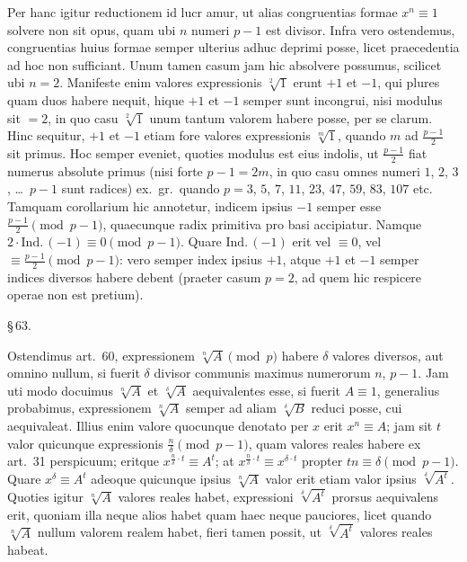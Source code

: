 \documentclass[12pt,a4paper]{article}
\theoremstyle{plain}
\theoremstyle{definition}
\theoremstyle{remark}
\begin{document}
Per hanc igitur reductionem id lucr amur, ut alias congruentias formae $x^n \equiv 1$ solvere non sit opus, quam ubi $n$ numeri $p-1$ est divisor. Infra vero ostendemus, congruentias huius formae semper ulterius adhuc deprimi posse, licet praecedentia ad hoc non sufficiant. Unum tamen casum jam hic absolvere possumus, scilicet ubi $n = 2$. Manifeste enim valores expressionis $\sqrt[2]{1}$ erunt $+1$ et $-1$, qui plures quam duos habere nequit, hique $+1$ et $-1$ semper sunt incongrui, nisi modulus sit $= 2$, in quo casu $\sqrt[2]{1}$ unum tantum valorem habere posse, per se clarum. Hinc sequitur, $+1$ et $-1$ etiam fore valores expressionis $\sqrt[m]{1}$, quando $m$ ad $\frac{p-1}{2}$ sit primus. Hoc semper eveniet, quoties modulus est eius indolis, ut $\frac{p-1}{2}$ fiat numerus absolute primus (nisi forte $p-1 = 2m$, in quo casu omnes numeri $1$, $2$, $3$, \dots\ $p-1$ sunt radices) ex.\ gr.\ quando $p = 3$, $5$, $7$, $11$, $23$, $47$, $59$, $83$, $107$ etc. Tamquam corollarium hic annotetur, indicem ipsius $-1$ semper esse $\frac{p-1}{2} \pmod{p-1}$, quaecunque radix primitiva pro basi accipiatur. Namque $2 \cdot \text{Ind.}\,(-1) \equiv 0 \pmod{p-1}$. Quare $\text{Ind.}\,(-1)$ erit vel $\equiv 0$, vel $\equiv \frac{p-1}{2} \pmod{p-1}$: vero semper index ipsius $+1$, atque $+1$ et $-1$ semper indices diversos habere debent (praeter casum $p = 2$, ad quem hic respicere operae non est pretium).

\begin{center}\S\,63.\end{center}

Ostendimus art.~60, expressionem $\sqrt[n]{A} \pmod{p}$ habere $\delta$ valores diversos, aut omnino nullum, si fuerit $\delta$ divisor communis maximus numerorum $n$, $p-1$. Jam uti modo docuimus $\sqrt[n]{A}$ et $\sqrt[\delta]{A}$ aequivalentes esse, si fuerit $A \equiv 1$, generalius probabimus, expressionem $\sqrt[n]{A}$ semper ad aliam $\sqrt[\delta]{B}$ reduci posse, cui aequivaleat. Illius enim valore quocunque denotato per $x$ erit $x^n \equiv A$; jam sit $t$ valor quicunque expressionis $\frac{n}{\delta} \pmod{p-1}$, quam valores reales habere ex art.~31 perspicuum; eritque $x^{\frac{n}{\delta} \cdot t} \equiv A^t$; at $x^{\frac{n}{\delta} \cdot t} \equiv x^{\delta \cdot t}$ propter $tn \equiv \delta \pmod{p-1}$. Quare $x^\delta \equiv A^t$ adeoque quicunque ipsius $\sqrt[n]{A}$ valor erit etiam valor ipsius $\sqrt[\delta]{A^t}$. Quoties igitur $\sqrt[n]{A}$ valores reales habet, expressioni $\sqrt[\delta]{A^t}$ prorsus aequivalens erit, quoniam illa neque alios habet quam haec neque pauciores, licet quando $\sqrt[n]{A}$ nullum valorem realem habet, fieri tamen possit, ut $\sqrt[\delta]{A^t}$ valores reales habeat.
\end{document}
